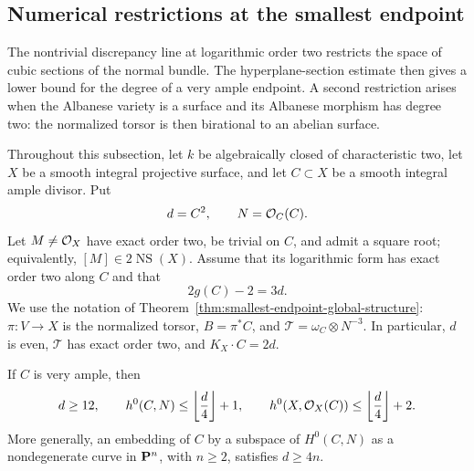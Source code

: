 \subsection{Numerical restrictions at the smallest endpoint}
\label{subsec:smallest-endpoint-numerical}

The nontrivial discrepancy line at logarithmic order two restricts
the space of cubic sections of the normal bundle.  The hyperplane-section
estimate then gives a lower bound for the degree of a very ample
endpoint.  A second restriction arises when the Albanese variety is a
surface and its Albanese morphism has degree two: the normalized torsor
is then birational to an abelian surface.

Throughout this subsection, let $k$ be algebraically closed of
characteristic two, let $X$ be a smooth integral projective surface,
and let $C\subset X$ be a smooth integral ample divisor.  Put
\[
 d=C^2,\qquad N=\mathcal O_C(C).
\]
Let $M\ne\mathcal O_X$ have exact order two, be trivial on $C$, and admit a
square root; equivalently, $[M]\in2\operatorname{NS}(X)$.
Assume that its logarithmic form has exact order two along $C$ and
that
\[
 2g(C)-2=3d.
\]
We use the notation of
Theorem~\ref{thm:smallest-endpoint-global-structure}:
$\pi:V\to X$ is the normalized torsor, $B=\pi^*C$, and
$\mathcal T=\omega_C\otimes N^{-3}$.
In particular, $d$ is even, $\mathcal T$ has exact order two, and
$K_X\cdot C=2d$.

\begin{proposition}
\label{prop:smallest-endpoint-very-ample-degree}
If $C$ is very ample, then
\[
 d\ge12,\qquad
 h^0(C,N)\le\left\lfloor\frac d4\right\rfloor+1,\qquad
 h^0(X,\mathcal O_X(C))\le\left\lfloor\frac d4\right\rfloor+2.
\]
More generally, an embedding of $C$ by a subspace of $H^0(C,N)$
as a nondegenerate curve in $\mathbf P^n$, with $n\ge2$, satisfies
$d\ge4n$.
\end{proposition}

